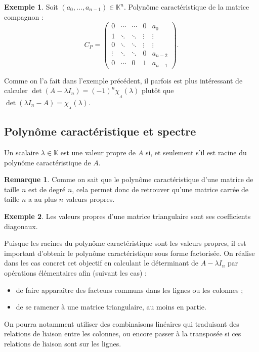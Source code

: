 \documentclass[french]{article}
\newcommand{\K}{\mathbb{K}}
\theoremstyle{plain}
\theoremstyle{definition}
\newtheorem*{ex}{Exemple}
\newtheorem*{rmq}{Remarque}
\theoremstyle{remark}
\begin{document}
	\begin{ex}
		Soit $(a_0,\ldots,a_{n-1})\in\K^n$. Polynôme caractéristique de la matrice compagnon :
		$$C_P=\begin{pmatrix}
			0&\cdots&\cdots&0&a_0\\
			1&\ddots&\ddots&\vdots&\vdots\\
			0&\ddots&\ddots&\vdots&\vdots\\
			\vdots&\ddots&\ddots&0&a_{n-2}\\
			0&\cdots&0&1&a_{n-1}
		\end{pmatrix}.$$
	\end{ex}
	
	\begin{met}
		Comme on l'a fait dans l'exemple précédent, il parfois est plus intéressant de calculer $\det(A-\lambda I_n)=(-1)^n\chi_{_A}(\lambda)$ plutôt que $\det(\lambda I_n-A)=\chi_{_A}(\lambda)$.
	\end{met}
	
	\subsection{Polynôme caractéristique et spectre}
	
	\begin{prop}%
		Un scalaire $\lambda\in\K$ est une valeur propre de $A$ si, et seulement s'il est racine du polynôme caractéristique de $A$.
	\end{prop}
	
	\begin{rmq}
		Comme on sait que le polynôme caractéristique d'une matrice de taille $n$ est de degré $n$, cela permet donc de retrouver qu'une matrice carrée de taille $n$ a au plus $n$ valeurs propres.
	\end{rmq}
	
	\begin{ex}
		Les valeurs propres d'une matrice triangulaire sont ses coefficients diagonaux.
	\end{ex}
	
	\begin{met}
		Puisque les racines du polynôme caractéristique sont les valeurs propres, il est important d'obtenir le polynôme caractéristique sous forme factorisée. On réalise dans les cas concret cet objectif en calculant le déterminant de $A-\lambda I_n$ par opérations élémentaires afin (suivant les cas) :
		\begin{itemize}
			\item de faire apparaître des facteurs communs dans les lignes ou les colonnes ;
			\item de se ramener à une matrice triangulaire, au moins en partie.
		\end{itemize} On pourra notamment utiliser des combinaisons linéaires qui traduisant des relations de liaison entre les colonnes, ou encore passer à la transposée si ces relations de liaison sont sur les lignes.
	\end{met}
	
\end{document}
